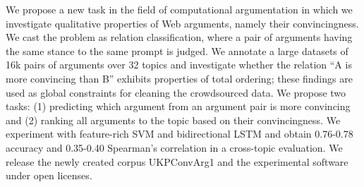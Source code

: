 We propose a new task in the field of computational argumentation in which we investigate qualitative properties of Web arguments, namely their convincingness. We cast the problem as relation classification, where a pair of arguments having the same stance to the same prompt is judged. We annotate a large datasets of 16k pairs of arguments over 32 topics and investigate whether the relation ``A is more convincing than B'' exhibits properties of total ordering; these findings are used as global constraints for cleaning the crowdsourced data. We propose two tasks: (1) predicting which argument from an argument pair is more convincing and (2) ranking all arguments to the topic based on their convincingness. We experiment with feature-rich SVM and bidirectional LSTM and obtain 0.76-0.78 accuracy and 0.35-0.40 Spearman's correlation in a cross-topic evaluation. We release the newly created corpus UKPConvArg1 and the experimental software under open licenses.
